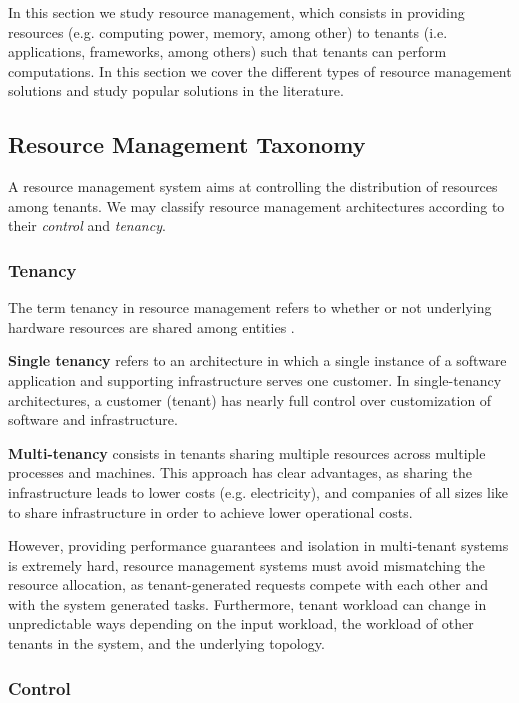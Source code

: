
In this section we study resource management, which consists in providing resources (e.g. computing power, memory, among other) to tenants (i.e. applications, frameworks, among others) such that tenants can perform computations. In this section we cover the different types of resource management solutions and study popular solutions in the literature.

\subsection{Resource Management Taxonomy}

A resource management system aims at controlling the distribution of resources among tenants. We may classify resource management architectures according to their \textit{control} and \textit{tenancy}. 

\subsubsection{Tenancy}

The term tenancy in resource management refers to whether or not underlying hardware resources are shared among entities \cite{Hong2019}. 

\textbf{Single tenancy} refers to an architecture in which a single instance of a software application and supporting infrastructure serves one customer. In single-tenancy architectures, a customer (tenant) has nearly full control over customization of software and infrastructure. 

\textbf{Multi-tenancy} consists in tenants sharing multiple resources across multiple processes and machines. This approach has clear advantages, as sharing the infrastructure leads to lower costs (e.g. electricity), and companies of all sizes like to share infrastructure in order to achieve lower operational costs. 

However, providing performance guarantees and isolation in multi-tenant systems is extremely hard, resource management systems must avoid mismatching the resource allocation, as tenant-generated requests compete with each other and with the system generated tasks. Furthermore, tenant workload can change in unpredictable ways depending on the input workload, the workload of other tenants in the system, and the underlying topology. 

\subsubsection{Control}

